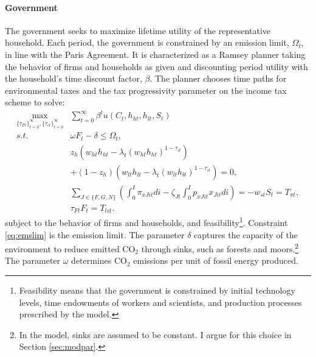 \paragraph{Government}

The government seeks to maximize lifetime utility of the representative household. Each period, the government is constrained by an emission limit, $\Omega_t$, in line with the Paris Agreement.  
It is characterized as a Ramsey planner taking the behavior of firms and households as given and discounting period utility with the household's time discount factor, $\beta$.
The planner chooses time paths for environmental taxes and the tax progressivity parameter on the income tax scheme to solve:%
\begin{align}
\underset{\{\tau_{Ft}\}_{t=0}^{\infty},\{\tau_{\iota t}\}_{t=0}^{\infty}}{\max}&\sum_{t=0}^{\infty}\beta^t u(C_{t}, h_{ht}, h_{lt}, S_t)%
\nonumber \\
s.t.\ \  %
&  \omega F_{t} -\delta \leq \Omega_t, \label{eq:emslim} %
\\ %
&  z_h\left(w_{ht}h_{ht}-\lambda_t \left(w_{ht}h_{ht}\right)^{1-\tau_{\iota t}}\right)\nonumber \\ & +(1-z_h)\left(w_{lt}h_{lt}-\lambda_t\left(w_{lt}h_{lt}\right)^{1-\tau_{\iota t}}\right)=0, \label{eq:incbud}\\
&  \sum_{J\in\{F,G,N\}}\left(\int_{0}^{I}\pi_{xJit}di-\zeta_{Jt}\int_{0}^{I}p_{xJit}x_{Jit}di\right) = - w_{st}S_t= T_{\pi t},\label{eq:profbud}\\ 
&  \tau_{Ft}F_{t}=T_{lst}.\label{eq:envbud}
\end{align}
subject to the behavior of firms and households, and feasibility\footnote{Feasibility means that the government is constrained by initial technology levels, time endowments of workers and scientists, and production processes prescribed by the model.}. 
Constraint \eqref{eq:emslim} is the emission limit. The parameter $\delta$ captures the capacity of the environment to reduce emitted CO$_2$ through sinks, such as forests and moors.\footnote{ In the model, sinks are assumed to be constant. I argue for this choice in Section \ref{sec:modpar}.}  The parameter $\omega$ determines  CO$_2$ emissions per unit of fossil energy produced. %

